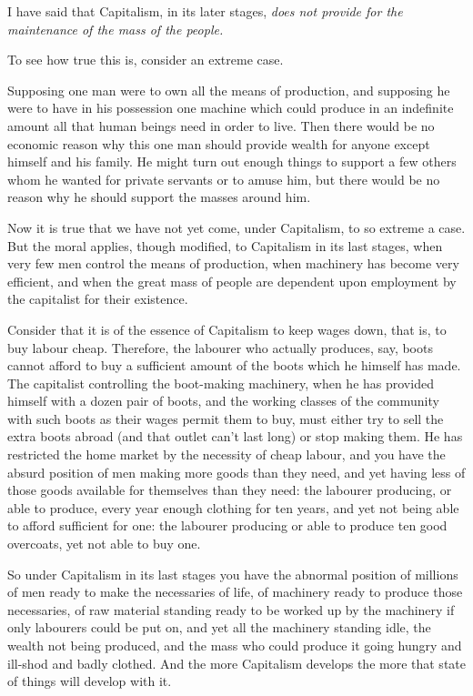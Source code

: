 \documentclass{book}
\begin{document}
I have said that Capitalism, in its later stages, \emph{does not provide for the maintenance of the mass of the people.}

To see how true this is, consider an extreme case.

Supposing one man were to own all the means of production, and supposing he were to have in his possession one machine which could produce in an indefinite amount all that human beings need in order to live. Then there would be no economic reason why this one man should provide wealth for anyone except himself and his family. He might turn out enough things to support a few others whom he wanted for private servants or to amuse him, but there would be no reason why he should support the masses around him.

Now it is true that we have not yet come, under Capitalism, to so extreme a case. But the moral applies, though modified, to Capitalism in its last stages, when very few men control the means of production, when machinery has become very efficient, and when the great mass of people are dependent upon employment by the capitalist for their existence.

Consider that it is of the essence of Capitalism to keep wages down, that is, to buy labour cheap. Therefore, the labourer who actually produces, say, boots cannot afford to buy a sufficient amount of the boots which he himself has made. The capitalist controlling the boot-making machinery, when he has provided himself with a dozen pair of boots, and the working classes of the community with such boots as their wages permit them to buy, must either try to sell the extra boots abroad (and that outlet can’t last long) or stop making them. He has restricted the home market by the necessity of cheap labour, and you have the absurd position of men making more goods than they need, and yet having less of those goods available for themselves than they need: the labourer producing, or able to produce, every year enough clothing for ten years, and yet not being able to afford sufficient for one: the labourer producing or able to produce ten good overcoats, yet not able to buy one.

So under Capitalism in its last stages you have the abnormal position of millions of men ready to make the necessaries of life, of machinery ready to produce those necessaries, of raw material standing ready to be worked up by the machinery if only labourers could be put on, and yet all the machinery standing idle, the wealth not being produced, and the mass who could produce it going hungry and ill-shod and badly clothed. And the more Capitalism develops the more that state of things will develop with it.
\end{document}
